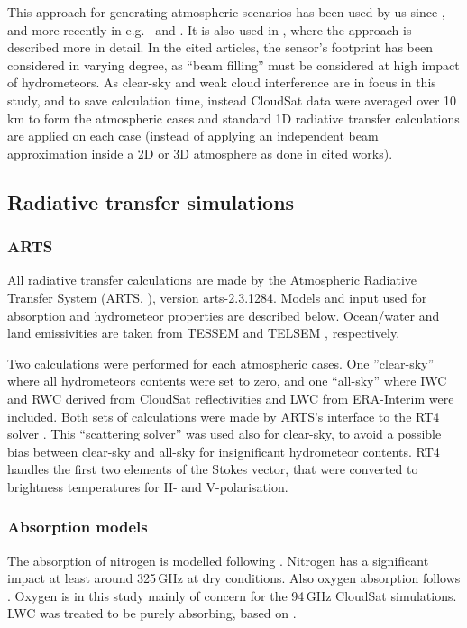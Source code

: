 \documentclass[12pt]{article}
\begin{document}
This approach for generating atmospheric scenarios has been used by us since
\citet{rydberg:nonga:09}, and more recently in e.g.\
\citet{eriksson:towar:20} and \citet{barlakas:three:20}. It is also used in
\citet{ekelund:using:20}, where the approach is described more in detail. In
the cited articles, the sensor's footprint has been considered in varying
degree, as ``beam filling'' must be considered at high impact of hydrometeors.
As clear-sky and weak cloud interference are in focus in this study, and to
save calculation time, instead CloudSat data were averaged over 10\,km to form
the atmospheric cases and standard 1D radiative transfer calculations are
applied on each case (instead of applying an independent beam approximation
inside a 2D or 3D atmosphere as done in cited works).



\subsection{Radiative transfer simulations}
%
\subsubsection{ARTS}
%
All radiative transfer calculations are made by the Atmospheric Radiative
Transfer System (ARTS, \citet{eriksson:arts2:11,buehler:artst:18}), version
arts-2.3.1284. Models and input used for absorption and hydrometeor properties
are described below. Ocean/water and land emissivities are taken from
TESSEM \citep{prigent2017sea} and TELSEM \citep{aires2011tool}, respectively.

Two calculations were performed for each atmospheric cases. One ''clear-sky''
where all hydrometeors contents were set to zero, and one ``all-sky'' where IWC
and RWC derived from CloudSat reflectivities and LWC from ERA-Interim were
included. Both sets of calculations were made by ARTS's interface to the
RT4 solver \citep{evans1995microwavec}. This ``scattering solver'' was used
also for clear-sky, to avoid a possible bias between clear-sky and all-sky for
insignificant hydrometeor contents. RT4 handles the first two elements of the
Stokes vector, that were converted to brightness temperatures for H- and
V-polarisation.


\subsubsection{Absorption models}
%
The absorption of nitrogen is modelled following \citet{pwr:93}. Nitrogen has a
significant impact at least around 325\,GHz at dry conditions. Also oxygen
absorption follows \citet{pwr:93}. Oxygen is in this study mainly of concern
for the 94\,GHz CloudSat simulations. LWC was treated to be
purely absorbing, based on \citet{ellison2007permittivity}.
\end{document}
